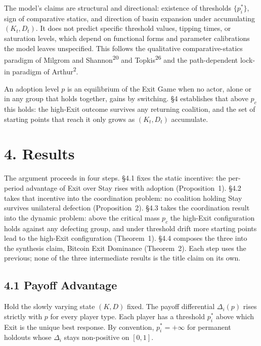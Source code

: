\documentclass[12pt]{article}
\theoremstyle{definition}
\theoremstyle{remark}
\begin{document}
The model's claims are structural and directional: existence of
thresholds $\{p_i^*\}$, sign of comparative statics, and
direction of basin expansion under accumulating $(K_t, D_t)$. It
does not predict specific threshold values, tipping times, or
saturation levels, which depend on functional forms and
parameter calibrations the model leaves unspecified. This
follows the qualitative comparative-statics paradigm of Milgrom
and Shannon\textsuperscript{20} and Topkis\textsuperscript{26}
and the path-dependent lock-in paradigm of
Arthur\textsuperscript{2}.

An adoption level $p$ is an equilibrium of the Exit Game when no actor, alone or in any group that holds together, gains by switching. \S4 establishes that above $p_c$ this holds: the high-Exit outcome survives any returning coalition, and the set of starting points that reach it only grows as $(K_t, D_t)$ accumulate.



\section{4. Results}

The argument proceeds in four steps. \S4.1 fixes the static
incentive: the per-period advantage of Exit over Stay rises with
adoption (Proposition~1). \S4.2 takes that incentive into the
coordination problem: no coalition holding Stay survives unilateral
defection (Proposition~2). \S4.3 takes the coordination result into
the dynamic problem: above the critical mass $p_c$ the high-Exit configuration holds against any defecting group, and under threshold drift
more starting points lead to the high-Exit configuration (Theorem~1). \S4.4 composes the three into the synthesis
claim, Bitcoin Exit Dominance (Theorem~2). Each step uses the previous;
none of the three intermediate results is the title claim on its
own.

\subsection{4.1 Payoff Advantage}

Hold the slowly varying state $(K, D)$ fixed. The payoff differential $\Delta_i(p)$ rises strictly with $p$ for every player type. Each player has a threshold $p_i^*$ above which Exit is the unique best response. By convention, $p_i^* = +\infty$ for permanent holdouts whose $\Delta_i$ stays non-positive on $[0, 1]$.
\end{document}
